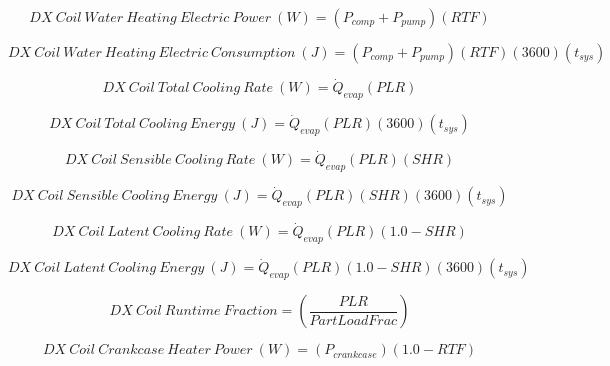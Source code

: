 \begin{equation}
DX~Coil~Water~Heating~Electric~Power~(W) = \left( {{P_{comp}} + {P_{pump}}} \right)\left( {RTF} \right)
\end{equation}

\begin{equation}
DX~Coil~Water~Heating~Electric~Consumption~(J) = \left( {{P_{comp}} + {P_{pump}}} \right)\left( {RTF} \right)\left( {3600} \right)\left( {{t_{sys}}} \right)
\end{equation}

\begin{equation}
DX~Coil~Total~Cooling~Rate~(W) = {\dot{Q}_{evap}}\left( {PLR} \right)
\end{equation}

\begin{equation}
DX~Coil~Total~Cooling~Energy~(J) = {\dot{Q}_{evap}}\left( {PLR} \right)\left( {3600} \right)\left( {{t_{sys}}} \right)
\end{equation}

\begin{equation}
DX~Coil~Sensible~Cooling~Rate~(W) = {\dot{Q}_{evap}}\left( {PLR} \right)\left( {SHR} \right)
\end{equation}

\begin{equation}
DX~Coil~Sensible~Cooling~Energy~(J) = {\dot{Q}_{evap}}\left( {PLR} \right)\left( {SHR} \right)\left( {3600} \right)\left( {{t_{sys}}} \right)
\end{equation}

\begin{equation}
DX~Coil~Latent~Cooling~Rate~(W) = {\dot{Q}_{evap}}\left( {PLR} \right)\left( {1.0 - SHR} \right)
\end{equation}

\begin{equation}
DX~Coil~Latent~Cooling~Energy~(J) = {\dot{Q}_{evap}}\left( {PLR} \right)\left( {1.0 - SHR} \right)\left( {3600} \right)\left( {{t_{sys}}} \right)
\end{equation}

\begin{equation}
DX~Coil~Runtime~Fraction = \left( \frac{PLR}{PartLoadFrac} \right)
\end{equation}

\begin{equation}
DX~Coil~Crankcase~Heater~Power~(W) = \left( {{P_{crankcase}}} \right)\left( {1.0 - RTF} \right)
\end{equation}

